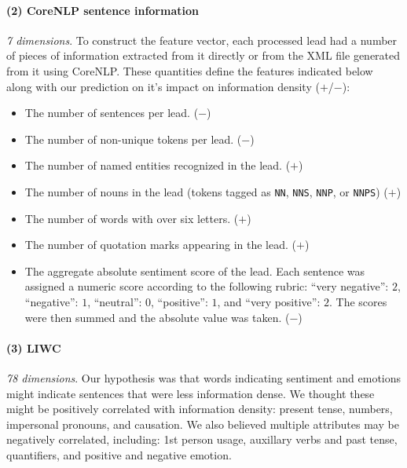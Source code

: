 \documentclass[
10pt, %
a4paper, %
oneside, %
headinclude,footinclude, %
BCOR5mm, %
]{scrartcl}
\begin{document}
\paragraph{\textbf{(2) CoreNLP sentence information}} 
\hfill \newline \noindent \textit{7 dimensions}. To construct the feature
vector, each processed lead had a number of pieces of information extracted from
it directly or from the XML file generated from it using CoreNLP. These
quantities define the features indicated below along with our prediction on it’s
impact on information density ($+$/$-$):
\begin{itemize}
	\item The number of sentences per lead. ($-$)
	\item The number of non-unique tokens per lead. ($-$)
	\item The number of named entities recognized in the lead. ($+$)
	\item The number of nouns in the lead (tokens tagged as \texttt{NN}, \texttt{NNS}, \texttt{NNP}, or \texttt{NNPS}) ($+$)
	\item The number of words with over six letters. ($+$)
	\item The number of quotation marks appearing in the lead. ($+$)
	\item The aggregate absolute sentiment score of the lead. Each sentence was assigned a numeric score according to the following rubric: ``very negative'': $2$, ``negative'': $1$, ``neutral'': $0$, ``positive'': $1$, and ``very positive'': $2$. The scores were then summed and the absolute value was taken. ($-$)
\end{itemize}

\paragraph{\textbf{(3) LIWC}}
\hfill \newline \noindent \textit{78 dimensions}. Our hypothesis was that words
indicating sentiment and emotions might indicate sentences that were less
information dense. We thought these might be positively correlated with
information density: present tense, numbers, impersonal pronouns, and causation.
We also believed multiple attributes may be negatively correlated, including:
1st person usage, auxillary verbs and past tense, quantifiers, and positive and
negative emotion.

\end{document}
